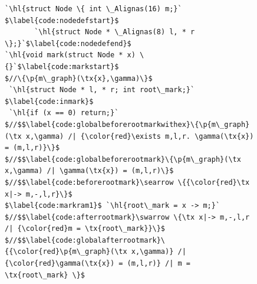 \documentclass[acmsmall,screen]{acmart}  %
\newcommand{\tx}[1]{\text{#1}}
\newcommand{\p}[1]{\ensuremath{\mathsf{#1}}} \newcommand{\m}[1]{\ensuremath{\mathit{#1}}} \newcommand{\ma}[1]{\ensuremath{\mathcal{#1}}} \let\ramify\lightning
\newcommand{\hl}[1]{\colorbox{lightgray}{#1}} %
\providecommand{\DIFaddbeginFL}{} %
\providecommand{\DIFdelendFL}{} %
\newcommand{\DIFaddincludegraphics}[2][]{{\color{blue}\fbox{\DIFOincludegraphics[#1]{#2}}}} %
\DeclareRobustCommand{\DIFaddbeginFL}{\DIFOaddbeginFL \let\includegraphics\DIFaddincludegraphics} %
\DeclareRobustCommand{\DIFdelendFL}{\DIFOaddendFL \let\includegraphics\DIFOincludegraphics} %
\begin{document}
\begin{figure}[t]
\DIFdelendFL \DIFaddbeginFL \begin{lstlisting}[multicols=2]
`\hl{struct Node \{ int \_Alignas(16) m;}` $\label{code:nodedefstart}$
       `\hl{struct Node * \_Alignas(8) l, * r \};}`$\label{code:nodedefend}$
`\hl{void mark(struct Node * x) \{}`$\label{code:markstart}$
$//\{\p{m\_graph}(\tx{x},\gamma)\}$
 `\hl{struct Node * l, * r; int root\_mark;}` $\label{code:inmark}$
 `\hl{if (x == 0) return;}`
$//$$\label{code:globalbeforerootmarkwithex}\{\p{m\_graph}(\tx x,\gamma) /| {\color{red}\exists m,l,r. \gamma(\tx{x}) = (m,l,r)}\}$
$//$$\label{code:globalbeforerootmark}\{\p{m\_graph}(\tx x,\gamma) /| \gamma(\tx{x}) = (m,l,r)\}$
$//$$\label{code:beforerootmark}\searrow \{{\color{red}\tx x|-> m,-,l,r}\}$
$\label{code:markram1}$ `\hl{root\_mark = x -> m;}`
$//$$\label{code:afterrootmark}\swarrow \{\tx x|-> m,-,l,r /| {\color{red}m = \tx{root\_mark}}\}$
$//$$\label{code:globalafterrootmark}\{{\color{red}\p{m\_graph}(\tx x,\gamma)} /| {\color{red}\gamma(\tx{x}) = (m,l,r)} /| m = \tx{root\_mark} \}$

\end{lstlisting}
\end{figure}
\end{document}

